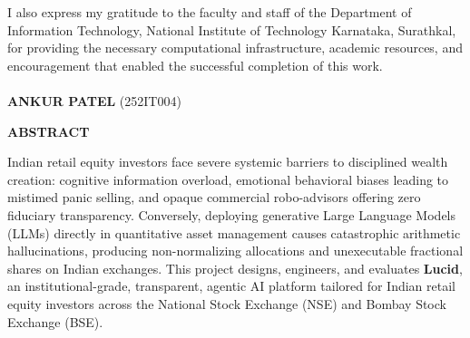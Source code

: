\documentclass[12pt, a4paper, openright, twoside]{report}
\begin{document}
I also express my gratitude to the faculty and staff of the Department of Information Technology, National Institute of Technology Karnataka, Surathkal, for providing the necessary computational infrastructure, academic resources, and encouragement that enabled the successful completion of this work.
\\
\\
\null \hfill \textbf{ANKUR PATEL} (252IT004)
\\

\clearpage
\thispagestyle{empty}
\null

\clearpage
{}
\setcounter{page}{1}

\thispagestyle{plain}
\begin{center}
\textbf{{\Large ABSTRACT}}\\
\end{center}

Indian retail equity investors face severe systemic barriers to disciplined wealth creation: cognitive information overload, emotional behavioral biases leading to mistimed panic selling, and opaque commercial robo-advisors offering zero fiduciary transparency. Conversely, deploying generative Large Language Models (LLMs) directly in quantitative asset management causes catastrophic arithmetic hallucinations, producing non-normalizing allocations and unexecutable fractional shares on Indian exchanges. This project designs, engineers, and evaluates \textbf{Lucid}, an institutional-grade, transparent, agentic AI platform tailored for Indian retail equity investors across the National Stock Exchange (NSE) and Bombay Stock Exchange (BSE). 
\end{document}
